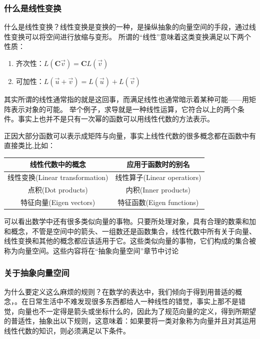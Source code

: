 \documentclass[UTF8]{ctexbook}
\begin{document}
{{{\subsubsection{什么是线性变换}{
  什么是线性变换？线性变换是变换的一种，是操纵抽象的向量空间的手段，通过线性变换可以将空间进行放缩与变形。
  所谓的“线性”意味着这类变换满足以下两个性质：

  \begin{enumerate}
    \item 齐次性：$L(\mathbf{C}\vec{v}) = \mathbf{C}L(\vec{v})$
    \item 可加性：$L(\vec{u}+\vec{v}) = L(\vec{u})+L(\vec{v})$
  \end{enumerate}

  其实所谓的线性通常指的就是这回事，而满足线性也通常暗示着某种可能——用矩阵表示对象的可能。
  举个例子，求导就是一种线性运算，它符合以上的两个条件。事实上也并不是只有一次幂的函数可以用线性代数的方法表示。

  正因大部分函数可以表示成矩阵与向量，事实上线性代数的很多概念都在函数中有直接类比,比如：

  \begin{tabular}{c|c}
    \hline
    线性代数中的概念                & 应用于函数时的别名          \\
    \hline
    线性变换(Linear transformation) & 线性算子(Linear operatiors) \\
    点积(Dot products)              & 内积(Inner products)        \\
    特征向量(Eigen vectors)         & 特征函数(Eigen functions)
  \end{tabular}

  可以看出数学中还有很多类似向量的事物。只要所处理对象，具有合理的数乘和加和概念，不管是空间中的箭头、一组数还是函数集合，线性代数中所有关于向量、线性变换和其他的概念都应该适用于它。这些类似向量的事物，它们构成的集合被称为向量空间。这些内容将在“抽象向量空间”章节中讨论
}%

\subsubsection{关于抽象向量空间}{
为什么要定义这么麻烦的规则？在数学的表达中，我们倾向于得到用普适的概念，{}。在日常生活中不难发现很多东西都给人一种线性的错觉，事实上那不是错觉，向量也不一定得是箭头或坐标什么的，因此为了规范向量的定义，得到所期望的普适性，抽象出以下规则，这意味着：如果要将一类对象称为向量并且对其运用线性代数的知识，则必须满足以下条件。

}}}}
\end{document}

